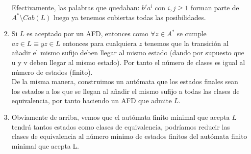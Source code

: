 \documentclass[11pt]{article}
\theoremstyle{ejercicio-style}
\begin{document}
\begin{enumerate}
	Efectivamente, las palabras que quedaban: $b^ja^i$ con $i,j \geq 1$ forman parte de $A^* \setminus Cab(L)$ luego ya tenemos cubiertas todas las posibilidades.
	
	\item Si $L$ es aceptado por un AFD, entonces como $\forall z \in A^*$ se cumple $az \in L \equiv yz \in L$ entonces para cualquiera $z$ tenemos que la transición al añadir el mismo sufijo deben llegar al mismo estado (dando por supuesto que u y v deben llegar al mismo estado). Por tanto el número de clases es igual al número de estados (finito). \\
	
	De la misma manera, construimos un autómata que los estados finales sean los estados a los que se llegan al añadir el mismo sufijo a todas las clases de equivalencia, por tanto haciendo un AFD que admite $L$.
	
	\item Obviamente de arriba, vemos que el autómata finito minimal que acepta $L$ tendrá tantos estados como clases de equivalencia, podríamos reducir las clases de equivalencia al número mínimo de estados finitos del autómata finito minimal que acepta L.
\end{enumerate}
\end{document}
